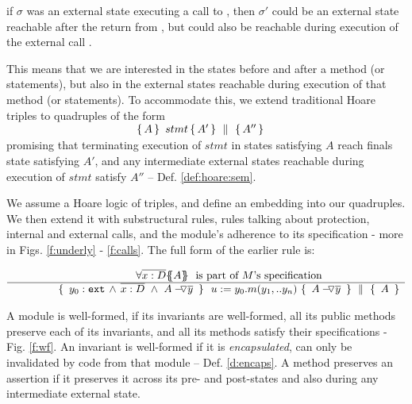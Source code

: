 \Eg if $\sigma$ was an external state executing a call to , then $\sigma'$ could be an external state reachable 
after the return from , but could also be reachable
during execution of the external call .

This means that we are  interested in the states before and after a method (or statements), but  also  in the external states reachable during execution of that method (or statements).
To accommodate this, we extend   traditional Hoare triples to quadruples of the form\\
 $\strut \ \hspace{4cm} \quadruple {A} {\, stmt\, }{A'} {A''}$\\  
 promising that terminating execution of $stmt$ in  states satisfying $A$  reach    finals state satisfying $A'$, and any intermediate external states reachable during execution of $stmt$ satisfy    $A''$ -- \cf Def. \ref{def:hoare:sem}.

\vspace{.1cm}

We assume a  Hoare logic of  triples, and define an embedding into our quadruples. 
We then extend it with substructural rules, rules talking about protection, internal and external calls, 
and the module's adherence to its 
specification - more in Figs. \ref{f:underly} -  \ref{f:calls}. %
The full form of  the  earlier %
 rule %
 is:
 
 $\inferruleNoName  
 	{ 
   	   {\TwoStatesN {\overline {x:D}} {A}}\ \   \mbox{is part of $M$'s specification}
        }
	{   \quadruple { \    { \external{y_0}} \,     \wedge \,  \overline{x:D}\  \wedge\  {\PushAS {y}{A}}\ }  
						{ \ u:=y_0.m(y_1,.. y_n)\    }
						{ \    {\PushAS {y}{A}}  \ }
						{\  A  \ }
         }
$
 
 \vspace{.2cm}
A module is well-formed, if  its invariants are well-formed,  all  its public methods preserve each of its invariants, and  all its methods satisfy their specifications - \cf  Fig.  \ref{f:wf}.
%
An invariant is well-formed if %
it is \emph{encapsulated}, \ie can only be invalidated by code from that module -- \cf Def. \ref{d:encaps}. 
% 
A method preserves an assertion   if it preserves it across its pre- and post-states and also during any intermediate external state.

